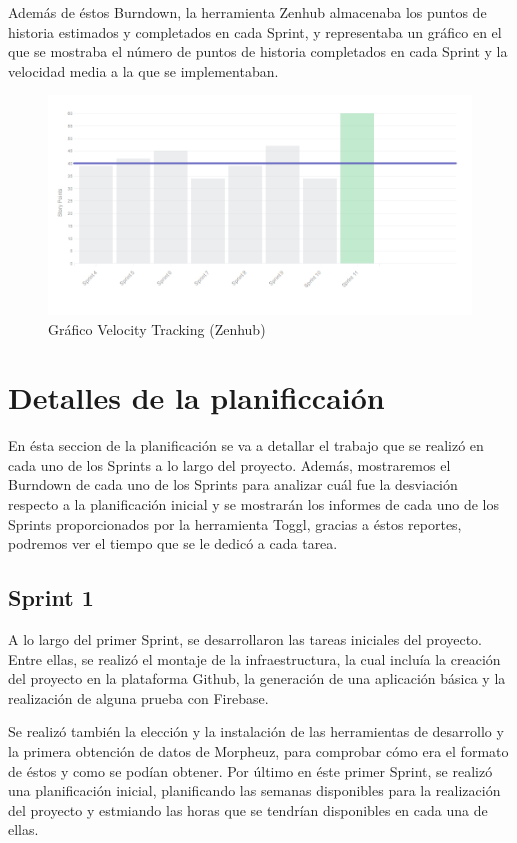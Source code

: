 \documentclass[11pt,openany]{book}
\begin{document}
Además de éstos Burndown, la herramienta Zenhub almacenaba los puntos de historia estimados y completados en cada Sprint, y representaba un gráfico en el que se mostraba el número de puntos de historia completados en cada Sprint y la velocidad media a la que se implementaban.

\begin{figure}[H]
\centering
\includegraphics[totalheight=5cm]{zenhub_velocity.png}
\caption{Gráfico Velocity Tracking (Zenhub)}
\end{figure}
\par\bigskip 
\noindent

\section{Detalles de la planificcaión}

En ésta seccion de la planificación se va a detallar el trabajo que se realizó en cada uno de los Sprints a lo largo del proyecto. Además, mostraremos el Burndown de cada uno de los Sprints para analizar cuál fue la desviación respecto a la planificación inicial y se mostrarán los informes de cada uno de los Sprints proporcionados por la herramienta Toggl, gracias a éstos reportes, podremos ver el tiempo que se le dedicó a cada tarea.

\subsection{Sprint 1}

A lo largo del primer Sprint, se desarrollaron las tareas iniciales del proyecto. Entre ellas, se realizó el montaje de la infraestructura, la cual incluía la creación del proyecto en la plataforma Github, la generación de una aplicación básica y la realización de alguna prueba con Firebase.

Se realizó también la elección y la instalación de las herramientas de desarrollo y la primera obtención de datos de Morpheuz, para comprobar cómo era el formato de éstos y como se podían obtener. Por último en éste primer Sprint, se realizó una planificación inicial, planificando las semanas disponibles para la realización del proyecto y estmiando las horas que se tendrían disponibles en cada una de ellas.
\end{document}
